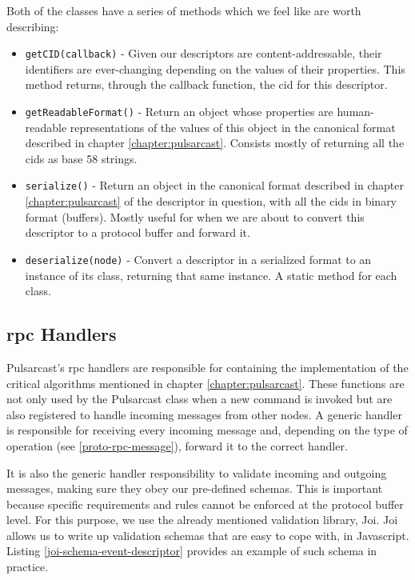 Both of the classes have a series of methods which we feel like are worth describing:

\begin{itemize}
  \item
    \verb|getCID(callback)| - Given our descriptors are content-addressable, their identifiers are ever-changing depending on the values of their properties. This method returns, through the callback function, the \acrshort{cid} for this descriptor.
  \item
    \verb|getReadableFormat()| - Return an object whose properties are human-readable representations of the values of this object in the canonical format described in chapter \ref{chapter:pulsarcast}. Consists mostly of returning all the \acrshort{cid}s as base 58 strings.
  \item
    \verb|serialize()| - Return an object in the canonical format described in chapter \ref{chapter:pulsarcast} of the descriptor in question, with all the \acrshort{cid}s in binary format (buffers). Mostly useful for when we are about to convert this descriptor to a protocol buffer and forward it.
  \item
    \verb|deserialize(node)| - Convert a descriptor in a serialized format to an instance of its class, returning that same instance. A static method for each class.
\end{itemize}


\subsection{\acrshort{rpc} Handlers}\label{subsec:rpc-handlers}

Pulsarcast's \acrshort{rpc} handlers are responsible for containing the
implementation of the critical algorithms mentioned in chapter
\ref{chapter:pulsarcast}. These functions are not only used by the Pulsarcast
class when a new command is invoked but are also registered to handle incoming
messages from other nodes.  A generic handler is responsible for receiving
every incoming message and, depending on the type of operation (see
\ref{proto-rpc-message}), forward it to the correct handler.

It is also the generic handler responsibility to validate incoming and outgoing
messages, making sure they obey our pre-defined schemas. This is important
because specific requirements and rules cannot be enforced at the protocol
buffer level. For this purpose, we use the already mentioned validation
library, Joi. Joi allows us to write up validation schemas that are easy to
cope with, in Javascript. Listing \ref{joi-schema-event-descriptor} provides an
example of such schema in practice.

